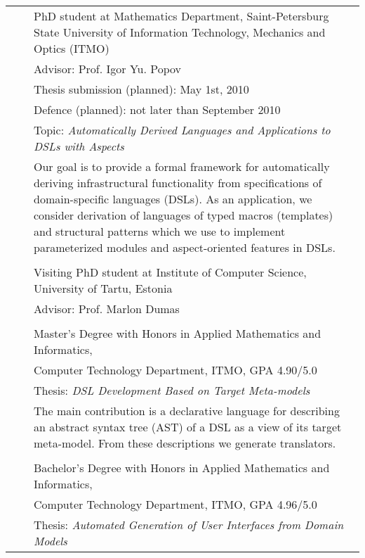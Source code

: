 \documentclass[a4paper, 12pt]{article}
\begin{document}
\begin{tabular*}{1.0\textwidth}[t]{p{70pt} l p{370pt}}
	\raggedleft{since 2007}&\hspace{10pt}&PhD student at Mathematics Department, Saint-Petersburg State University of Information Technology, Mechanics and Optics (ITMO)\\
	&&Advisor: Prof. Igor Yu. Popov \\
	&&Thesis submission (planned): May 1st, 2010\\
	&&Defence (planned): not later than September 2010\\
	&&Topic: \textit{Automatically Derived Languages and Applications to DSLs with Aspects}\\
	&&Our goal is to provide a formal framework for automatically deriving infrastructural functionality 
	  from specifications of domain-specific languages (DSLs).
	  As an application, we consider derivation of languages of typed macros (templates) and structural patterns
	  which we use to implement parameterized modules and aspect-oriented features in DSLs. \\
	&&\\
	\raggedleft{2009 -- 2010}&& Visiting PhD student at Institute of Computer Science, University of Tartu, Estonia\\
	&&Advisor: Prof. Marlon Dumas \\
	&&\\
	\raggedleft{2007} && Master's Degree with Honors in Applied Mathematics and Informatics, \\
	&&Computer Technology Department, ITMO, GPA 4.90/5.0\\
	&&Thesis: \textit{DSL Development Based on Target Meta-models}\\
	&&The main contribution is a declarative language for describing an abstract syntax tree (AST) of a 
	  DSL as a view of its target meta-model. From these descriptions we generate translators. \\
	&&\\
	\raggedleft{2005} && Bachelor's Degree with Honors in Applied Mathematics and Informatics, \\
	&&Computer Technology Department, ITMO, GPA 4.96/5.0\\
	&&Thesis: \textit{Automated Generation of User Interfaces from Domain Models}\\
\end{tabular*}
\end{document}
